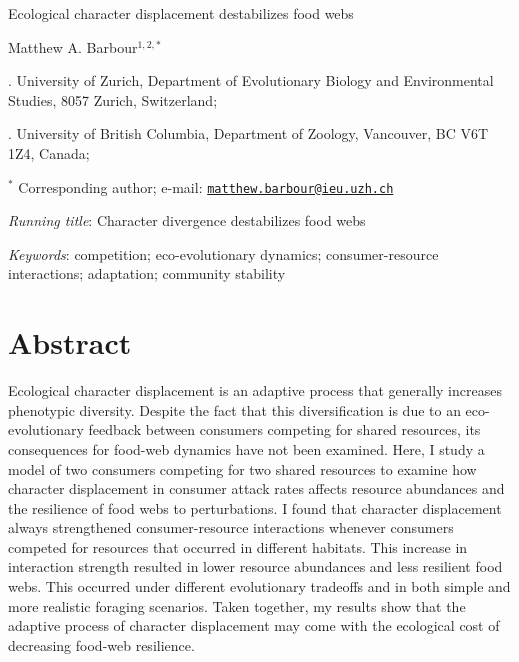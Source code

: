 \documentclass[11pt,]{article}
\title{}
\author{}
\date{}
\begin{document}
\vspace*{0.1cm}

\begin{center} \LARGE Ecological character displacement destabilizes food webs \end{center}

\bigskip

\begin{center} \large Matthew A. Barbour$^{1,2,\ast}$ \normalsize \end{center}

\bigskip

. University of Zurich, Department of Evolutionary Biology
and Environmental Studies, 8057 Zurich, Switzerland;

. University of British Columbia, Department of Zoology,
Vancouver, BC V6T 1Z4, Canada;

\(^\ast\) Corresponding author; e-mail:
\href{mailto:matthew.barbour@ieu.uzh.ch}{\nolinkurl{matthew.barbour@ieu.uzh.ch}}

\bigskip

\emph{Running title}: Character divergence destabilizes food webs

\bigskip

\emph{Keywords}: competition; eco-evolutionary dynamics;
consumer-resource interactions; adaptation; community stability

\linenumbers{} \modulolinenumbers[3]

\newpage

\section{Abstract}\label{abstract}

Ecological character displacement is an adaptive process that generally
increases phenotypic diversity. Despite the fact that this
diversification is due to an eco-evolutionary feedback between consumers
competing for shared resources, its consequences for food-web dynamics
have not been examined. Here, I study a model of two consumers competing
for two shared resources to examine how character displacement in
consumer attack rates affects resource abundances and the resilience of
food webs to perturbations. I found that character displacement always
strengthened consumer-resource interactions whenever consumers competed
for resources that occurred in different habitats. This increase in
interaction strength resulted in lower resource abundances and less
resilient food webs. This occurred under different evolutionary
tradeoffs and in both simple and more realistic foraging scenarios.
Taken together, my results show that the adaptive process of character
displacement may come with the ecological cost of decreasing food-web
resilience.
\end{document}
